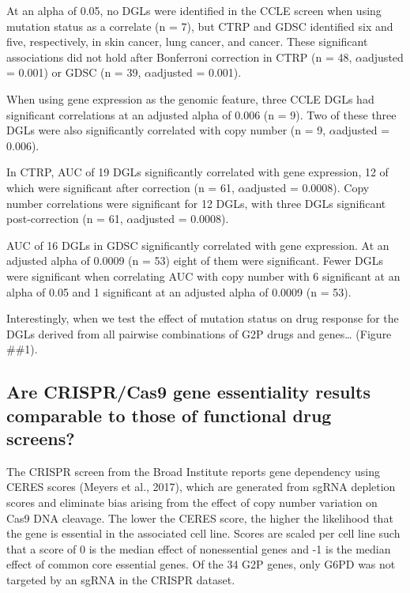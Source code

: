 \documentclass[man]{apa6}
\begin{document}
At an alpha of 0.05, no DGLs were identified in the CCLE screen when
using mutation status as a correlate (n = 7), but CTRP and GDSC
identified six and five, respectively, in skin cancer, lung cancer, and
cancer. These significant associations did not hold after Bonferroni
correction in CTRP (n = 48, \(\alpha\)adjusted = 0.001) or GDSC (n = 39,
\(\alpha\)adjusted = 0.001).

When using gene expression as the genomic feature, three CCLE DGLs had
significant correlations at an adjusted alpha of 0.006 (n = 9). Two of
these three DGLs were also significantly correlated with copy number (n
= 9, \(\alpha\)adjusted = 0.006).

In CTRP, AUC of 19 DGLs significantly correlated with gene expression,
12 of which were significant after correction (n = 61,
\(\alpha\)adjusted = 0.0008). Copy number correlations were significant
for 12 DGLs, with three DGLs significant post-correction (n = 61,
\(\alpha\)adjusted = 0.0008).

AUC of 16 DGLs in GDSC significantly correlated with gene expression. At
an adjusted alpha of 0.0009 (n = 53) eight of them were significant.
Fewer DGLs were significant when correlating AUC with copy number with 6
significant at an alpha of 0.05 and 1 significant at an adjusted alpha
of 0.0009 (n = 53).

Interestingly, when we test the effect of mutation status on drug
response for the DGLs derived from all pairwise combinations of G2P
drugs and genes\ldots{} (Figure \#\#1).

\subsection{Are CRISPR/Cas9 gene essentiality results comparable to
those of functional drug
screens?}\label{are-crisprcas9-gene-essentiality-results-comparable-to-those-of-functional-drug-screens}

The CRISPR screen from the Broad Institute reports gene dependency using
CERES scores (Meyers et al., 2017), which are generated from sgRNA
depletion scores and eliminate bias arising from the effect of copy
number variation on Cas9 DNA cleavage. The lower the CERES score, the
higher the likelihood that the gene is essential in the associated cell
line. Scores are scaled per cell line such that a score of 0 is the
median effect of nonessential genes and -1 is the median effect of
common core essential genes. Of the 34 G2P genes, only G6PD was not
targeted by an sgRNA in the CRISPR dataset.
\end{document}
